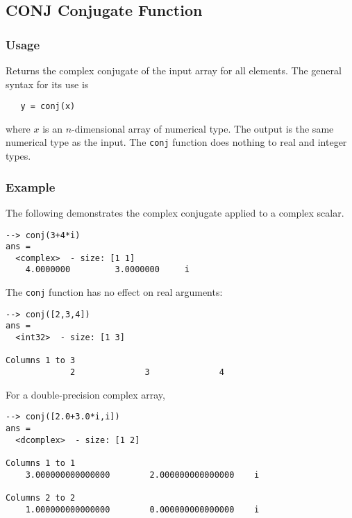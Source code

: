 %
%
%
\subsection{CONJ Conjugate Function}
\subsubsection{Usage}
Returns the complex conjugate of the input array for all elements.  The 
general syntax for its use is
\begin{verbatim}
   y = conj(x)
\end{verbatim}
where $x$ is an $n$-dimensional array of numerical type.  The output 
is the same numerical type as the input.  The \verb|conj| function does
nothing to real and integer types.
\subsubsection{Example}
The following demonstrates the complex conjugate applied to a complex scalar.
\begin{verbatim}
--> conj(3+4*i)
ans =
  <complex>  - size: [1 1]
    4.0000000         3.0000000     i
\end{verbatim}
The \verb|conj| function has no effect on real arguments:
\begin{verbatim}
--> conj([2,3,4])
ans =
  <int32>  - size: [1 3]
  
Columns 1 to 3
             2              3              4
\end{verbatim}
For a double-precision complex array,
\begin{verbatim}
--> conj([2.0+3.0*i,i])
ans =
  <dcomplex>  - size: [1 2]
  
Columns 1 to 1
    3.000000000000000        2.000000000000000    i
  
Columns 2 to 2
    1.000000000000000        0.000000000000000    i
\end{verbatim}
